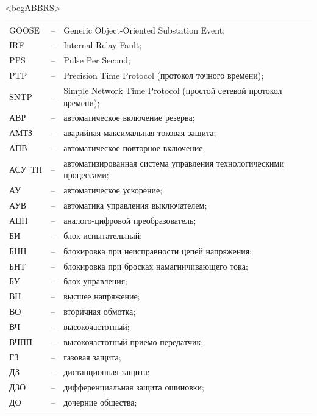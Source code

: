 \color{unimain}\section*{}
{\color{white}\fontsize{0.1pt}{0.1pt}\selectfont<begABBRS>}
\color{black}
\begin{longtable}{>{\raggedright\arraybackslash}m{2cm}>{\raggedright\arraybackslash}m{0.5cm}>{\raggedright\arraybackslash}m{20cm}}
\endfirsthead\endhead\endfoot\endlastfoot
GOOSE & -- & Generic Object-Oriented Substation Event; \\
IRF & -- & Internal Relay Fault; \\
PPS & -- & Pulse Per Second; \\
PTP & -- & Precision Time Protocol (протокол точного времени); \\
SNTP & -- & Simple Network Time Protocol (простой сетевой протокол времени); \\
АВР & -- & автоматическое включение резерва; \\
АМТЗ & -- & аварийная максимальная токовая защита; \\
АПВ & -- & автоматическое повторное включение; \\
АСУ~ТП & -- & автоматизированная система управления технологическими процессами; \\
АУ & -- & автоматическое ускорение; \\
АУВ & -- & автоматика управления выключателем; \\
АЦП & -- & аналого-цифровой преобразователь; \\
БИ & -- & блок испытательный; \\
БНН & -- & блокировка при неисправности цепей напряжения; \\
БНТ & -- & блокировка при бросках намагничивающего тока; \\
БУ & -- & блок управления; \\
ВН & -- & высшее напряжение; \\
ВО & -- & вторичная обмотка; \\
ВЧ & -- & высокочастотный; \\
ВЧПП & -- & высокочастотный приемо-передатчик; \\
ГЗ & -- & газовая защита; \\
ДЗ & -- & дистанционная защита; \\
ДЗО & -- & дифференциальная защита ошиновки; \\
ДО & -- & дочерние общества; \\

\end{longtable}
